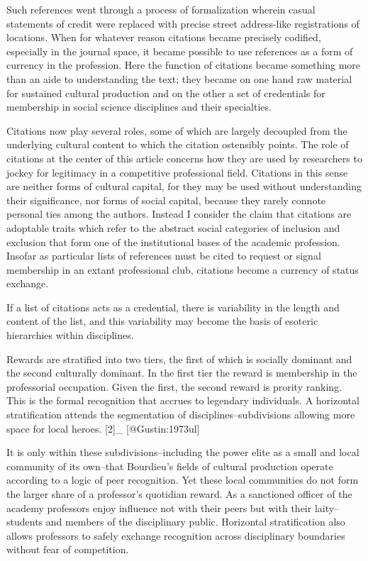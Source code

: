 Such references went through a process of formalization wherein casual
statements of credit were replaced with precise street address-like
registrations of locations. When for whatever reason citations became
precisely codified, especially in the journal space, it became possible
to use references as a form of currency in the profession. Here the
function of citations became something more than an aide to
understanding the text; they became on one hand raw material for
sustained cultural production and on the other a set of credentials for
membership in social science disciplines and their specialties.

Citations now play several roles, some of which are largely decoupled
from the underlying cultural content to which the citation ostensibly
points. The role of citations at the center of this article concerns how
they are used by researchers to jockey for legitimacy in a competitive
professional field. Citations in this sense are neither forms of
cultural capital, for they may be used without understanding their
significance, nor forms of social capital, because they rarely connote
personal ties among the authors. Instead I consider the claim that
citations are adoptable traits which refer to the abstract social
categories of inclusion and exclusion that form one of the institutional
bases of the academic profession. Insofar as particular lists of
references must be cited to request or signal membership in an extant
professional club, citations become a currency of status exchange.

If a list of citations acts as a credential, there is variability in the
length and content of the list, and this variability may become the
basis of esoteric hierarchies within disciplines.

Rewards are stratified into two tiers, the first of which is socially
dominant and the second culturally dominant. In the first tier the
reward is membership in the professorial occupation. Given the first,
the second reward is prority ranking. This is the formal recognition
that accrues to legendary individuals. A horizontal stratification
attends the segmentation of disciplines--subdivisions allowing more
space for local heroes.  [2]_ [@Gustin:1973ul]

It is only within these subdivisions--including the power elite as a
small and local community of its own--that Bourdieu's fields of cultural
production operate according to a logic of peer recognition. Yet these
local communities do not form the larger share of a professor's
quotidian reward. As a sanctioned officer of the academy professors
enjoy influence not with their peers but with their laity--students and
members of the disciplinary public. Horizontal stratification also
allows professors to safely exchange recognition across disciplinary
boundaries without fear of competition.

